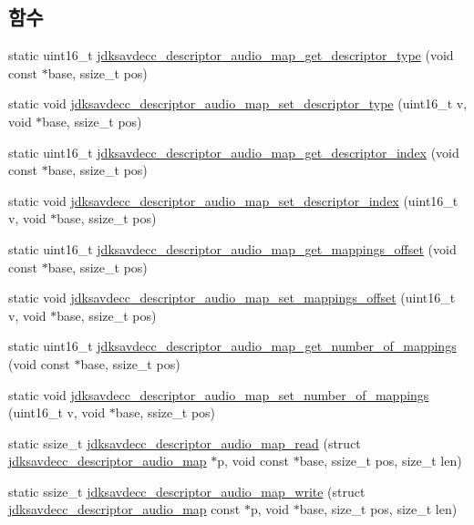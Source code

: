 \subsection*{함수}
\begin{DoxyCompactItemize}
\item 
static uint16\+\_\+t \hyperlink{group__descriptor__audio__map_gab57df9d786be8ce514ac81a5fd218f05}{jdksavdecc\+\_\+descriptor\+\_\+audio\+\_\+map\+\_\+get\+\_\+descriptor\+\_\+type} (void const $\ast$base, ssize\+\_\+t pos)
\item 
static void \hyperlink{group__descriptor__audio__map_gab7dfc463aff46348d705a4d831ca36d0}{jdksavdecc\+\_\+descriptor\+\_\+audio\+\_\+map\+\_\+set\+\_\+descriptor\+\_\+type} (uint16\+\_\+t v, void $\ast$base, ssize\+\_\+t pos)
\item 
static uint16\+\_\+t \hyperlink{group__descriptor__audio__map_ga9077f7e1cdcabda7ff66624904e2464d}{jdksavdecc\+\_\+descriptor\+\_\+audio\+\_\+map\+\_\+get\+\_\+descriptor\+\_\+index} (void const $\ast$base, ssize\+\_\+t pos)
\item 
static void \hyperlink{group__descriptor__audio__map_gaa3a839e21398345dd1797f66e148fbdd}{jdksavdecc\+\_\+descriptor\+\_\+audio\+\_\+map\+\_\+set\+\_\+descriptor\+\_\+index} (uint16\+\_\+t v, void $\ast$base, ssize\+\_\+t pos)
\item 
static uint16\+\_\+t \hyperlink{group__descriptor__audio__map_ga369b9ebfaae3ca2590e06417bcdbbd9f}{jdksavdecc\+\_\+descriptor\+\_\+audio\+\_\+map\+\_\+get\+\_\+mappings\+\_\+offset} (void const $\ast$base, ssize\+\_\+t pos)
\item 
static void \hyperlink{group__descriptor__audio__map_ga60e089dae6760e0a6eba4ec42db5b50d}{jdksavdecc\+\_\+descriptor\+\_\+audio\+\_\+map\+\_\+set\+\_\+mappings\+\_\+offset} (uint16\+\_\+t v, void $\ast$base, ssize\+\_\+t pos)
\item 
static uint16\+\_\+t \hyperlink{group__descriptor__audio__map_ga59b4ae6826866f6cefd533a4b813cbe0}{jdksavdecc\+\_\+descriptor\+\_\+audio\+\_\+map\+\_\+get\+\_\+number\+\_\+of\+\_\+mappings} (void const $\ast$base, ssize\+\_\+t pos)
\item 
static void \hyperlink{group__descriptor__audio__map_ga19f42555dc877c8c0286d7d0b26f932a}{jdksavdecc\+\_\+descriptor\+\_\+audio\+\_\+map\+\_\+set\+\_\+number\+\_\+of\+\_\+mappings} (uint16\+\_\+t v, void $\ast$base, ssize\+\_\+t pos)
\item 
static ssize\+\_\+t \hyperlink{group__descriptor__audio__map_gae2eb0d9fdddb2c5269075fc5506e2413}{jdksavdecc\+\_\+descriptor\+\_\+audio\+\_\+map\+\_\+read} (struct \hyperlink{structjdksavdecc__descriptor__audio__map}{jdksavdecc\+\_\+descriptor\+\_\+audio\+\_\+map} $\ast$p, void const $\ast$base, ssize\+\_\+t pos, size\+\_\+t len)
\item 
static ssize\+\_\+t \hyperlink{group__descriptor__audio__map_gacb4e95fe8ccec543e7af88f2f450dff0}{jdksavdecc\+\_\+descriptor\+\_\+audio\+\_\+map\+\_\+write} (struct \hyperlink{structjdksavdecc__descriptor__audio__map}{jdksavdecc\+\_\+descriptor\+\_\+audio\+\_\+map} const $\ast$p, void $\ast$base, size\+\_\+t pos, size\+\_\+t len)
\end{DoxyCompactItemize}



